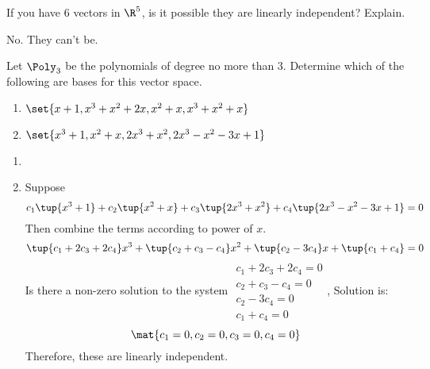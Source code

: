 \begin{enumialphparenastyle}
\begin{ex} If you have $6$ vectors in $\R^{5}$, is it possible they are
linearly independent? Explain. 
\begin{sol}
No. They can't be.
\end{sol}
\end{ex}

\begin{ex} Let $\Poly_3$ be the polynomials of degree no more than 3. Determine which
of the following are bases for this vector space.

\begin{enumerate}
\item $\set{x+1,x^{3}+x^{2}+2x,x^{2}+x,x^{3}+x^{2}+x} $

\item $\set{x^{3}+1,x^{2}+x,2x^{3}+x^{2},2x^{3}-x^{2}-3x+1} $
\end{enumerate}

\begin{sol}
\begin{enumerate}
\item 
\item
Suppose
\[
c_{1}\tup{x^{3}+1} +c_{2}\tup{x^{2}+x} +c_{3}\tup{
2x^{3}+x^{2}} +c_{4}\tup{2x^{3}-x^{2}-3x+1} =0
\]
Then combine the terms according to power of $x$.
\[
\tup{c_{1}+2c_{3}+2c_{4}} x^{3}+\tup{c_{2}+c_{3}-c_{4}}
x^{2}+\tup{c_{2}-3c_{4}} x+\tup{c_{1}+c_{4}} =0
\]
Is there a non-zero solution to the system $
\begin{array}{c}
c_{1}+2c_{3}+2c_{4}=0 \\
c_{2}+c_{3}-c_{4}=0 \\
c_{2}-3c_{4}=0 \\
c_{1}+c_{4}=0
\end{array}
$, Solution is:
\[
\mat{c_{1}=0,c_{2}=0,c_{3}=0,c_{4}=0}
\]
Therefore, these are linearly independent.
\end{enumerate}
\end{sol}
\end{ex}


\end{enumialphparenastyle}
